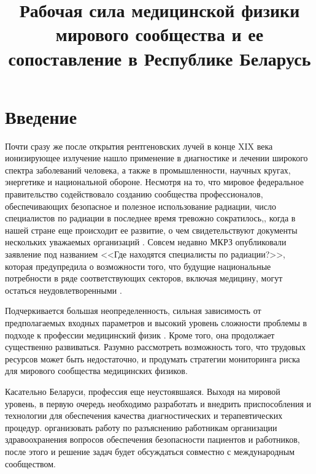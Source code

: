 \documentclass[a4paper,10pt]{extarticle}
\title{Рабочая сила медицинской физики мирового сообщества и ее 
сопоставление в Республике Беларусь} %
\begin{document}
\maketitle


\section{Введение}{\parindent 1.27cm}

Почти сразу же после открытия рентгеновских лучей в конце XIX века \cite{W. C. Röntgen} ионизирующее излучение нашло применение в диагностике и лечении широкого спектра заболеваний человека, а также в промышленности, научных кругах, энергетике и национальной обороне. Несмотря на то, что мировое федеральное правительство содействовало созданию сообщества профессионалов, обеспечивающих безопасное и полезное использование радиации, число специалистов по радиации в последнее время тревожно сократилось,, когда в нашей стране еще происходит ее развитие,  о чем свидетельствуют документы нескольких уважаемых организаций \cite{USGAO 2014}\cite{HPS 2013}\cite{NCRP 2015}. Совсем недавно МКРЗ опубликовали заявление под названием <<Где находятся специалисты по радиации?>>, которая предупредила о возможности того, что будущие национальные потребности в ряде соответствующих секторов, включая медицину, могут остаться неудовлетворенными \cite{NCRP 2015}.

Подчеркивается большая неопределенность, сильная зависимость от предполагаемых входных параметров и высокий уровень сложности проблемы в подходе к профессии медицинский физик \cite{Mills MD.2014}. Кроме того, она продолжает существенно развиваться. Разумно рассмотреть возможность того, что трудовых ресурсов может быть недостаточно, и продумать стратегии мониторинга риска для мирового сообщества медицинских физиков.

Касательно Беларуси, профессия еще неустоявшаяся. Выходя на мировой уровень, в первую очередь необходимо разработать и внедрить приспособления и технологии для обеспечения качества диагностических и терапевтических процедур. организовать работу по разъяснению работникам организации здравоохранения вопросов обеспечения безопасности пациентов и работников, после этого и решение задач будет обсуждаться совместно с международным сообществом.
\end{document}
